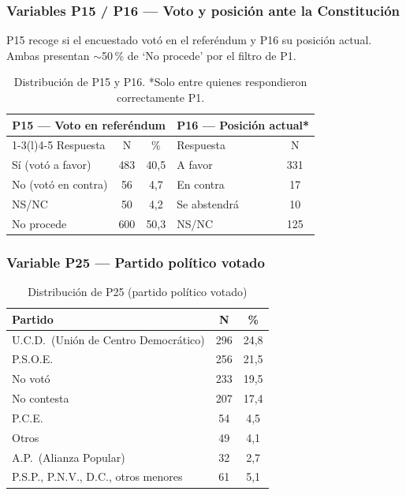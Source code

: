 \documentclass[12pt,a4paper]{article}
\newcommand{\thead}[1]{\cellcolor{tableheader}\color{white}\textbf{#1}}
\begin{document}
\subsubsection{Variables P15 / P16 — Voto y posición ante la Constitución}

P15 recoge si el encuestado votó en el referéndum y P16 su posición actual. Ambas presentan $\sim$50\,\% de `No procede' por el filtro de P1.

\begin{table}[H]
\centering
\renewcommand{\arraystretch}{1.3}
\begin{tabular}{lcc lc}
\toprule
\multicolumn{3}{c}{\thead{P15 — Voto en referéndum}} & \multicolumn{2}{c}{\thead{P16 — Posición actual*}} \\
\cmidrule(r){1-3}\cmidrule(l){4-5}
Respuesta & N & \% & Respuesta & N \\
\midrule
Sí (votó a favor)  & 483 & 40,5 & A favor     & 331 \\
\rowcolor{tablerow}
No (votó en contra)&  56 &  4,7 & En contra   &  17 \\
NS/NC              &  50 &  4,2 & Se abstendrá&  10 \\
\rowcolor{tablerow}
No procede         & 600 & 50,3 & NS/NC       & 125 \\
\bottomrule
\end{tabular}
\caption{Distribución de P15 y P16. *Solo entre quienes respondieron correctamente P1.}
\end{table}

\subsubsection{Variable P25 — Partido político votado}

\begin{table}[H]
\centering
\renewcommand{\arraystretch}{1.3}
\begin{tabular}{lcc}
\toprule
\thead{Partido} & \thead{N} & \thead{\%} \\
\midrule
U.C.D.\ (Unión de Centro Democrático) & 296 & 24,8 \\
\rowcolor{tablerow}
P.S.O.E.                              & 256 & 21,5 \\
No votó                               & 233 & 19,5 \\
\rowcolor{tablerow}
No contesta                           & 207 & 17,4 \\
P.C.E.                                &  54 &  4,5 \\
\rowcolor{tablerow}
Otros                                 &  49 &  4,1 \\
A.P.\ (Alianza Popular)               &  32 &  2,7 \\
\rowcolor{tablerow}
P.S.P., P.N.V., D.C., otros menores   &  61 &  5,1 \\
\bottomrule
\end{tabular}
\caption{Distribución de P25 (partido político votado)}
\end{table}
\end{document}
